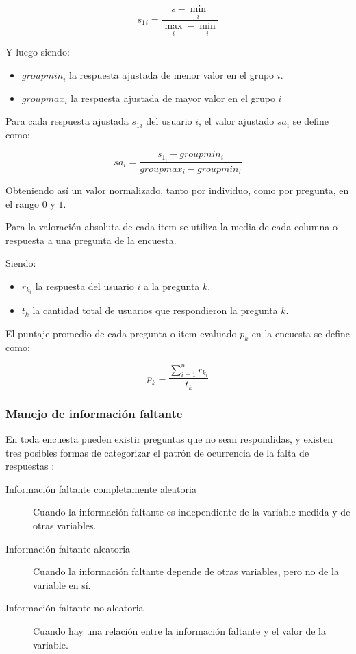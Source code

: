 \begin{equation*}
s_1{_i}=\frac{s-\min_i}{\max_i-\min_i}
\end{equation*}

Y luego siendo:
\begin{itemize}
	\item $groupmin_i$ la respuesta ajustada de menor valor en el grupo $i$.
	\item $groupmax_i$ la respuesta ajustada de mayor valor en el grupo $i$
\end{itemize}

Para cada respuesta ajustada $s_1{_i}$ del usuario $i$, el valor ajustado $sa_i$ se
define como:	

\begin{equation*}
sa_i=\frac{s_{1_i}-groupmin_i}{groupmax_i-groupmin_i}
\end{equation*}

Obteniendo así un valor normalizado, tanto por individuo, como por pregunta, en
el rango $0$ y $1$.

Para la valoración absoluta de cada  item se utiliza la media de cada columna o
respuesta a una pregunta de la encuesta.

Siendo:
\begin{itemize} 
\item $r_{k_i}$ la respuesta del usuario $i$ a la pregunta $k$.
\item $t_k$ la cantidad total de usuarios que respondieron la pregunta $k$.
\end{itemize}

El puntaje promedio de cada pregunta o item evaluado  $p_k$ en la encuesta se
define como:

\begin{equation*}
p_k = \frac{\sum_{i=1}^n{r_{k_i}}}{t_k}
\end{equation*}

\subsubsection{Manejo de información faltante}
\label{sec:informacion_faltante}

En toda encuesta pueden existir preguntas que no sean respondidas, y existen
tres posibles formas de categorizar el patrón de ocurrencia de la falta de
respuestas\cite{leite2010performance}
\cite{leite2010performance}\cite{tsikriktsis2005review}:

\begin{description}
    \item[Información faltante completamente aleatoria] Cuando la información
        faltante es independiente de la variable medida y de otras variables.
    \item[Información faltante aleatoria] Cuando la información faltante depende
        de otras variables, pero no de la variable en sí. 
    \item[Información faltante no aleatoria] Cuando hay una relación entre la
        información faltante y el valor de la variable.
\end{description}

